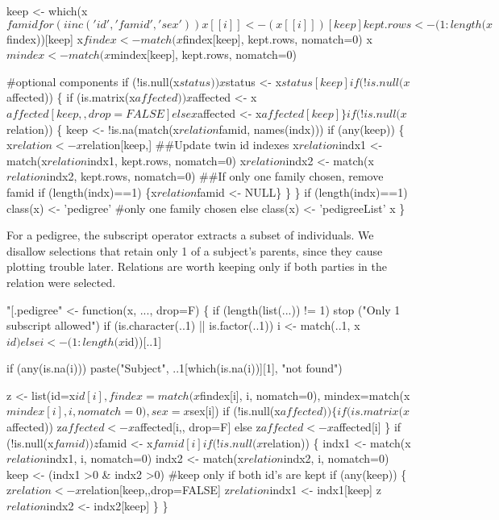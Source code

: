 \documentclass{article}
\begin{document}
    keep <- which(x$famid %
    for (i in c('id', 'famid', 'sex'))
        x[[i]] <- (x[[i]])[keep]
    
    kept.rows <- (1:length(x$findex))[keep]
    x$findex <- match(x$findex[keep], kept.rows, nomatch=0)
    x$mindex <- match(x$mindex[keep], kept.rows, nomatch=0)
    
    #optional components
    if (!is.null(x$status)) x$status <- x$status[keep]
    if (!is.null(x$affected)) \{
        if (is.matrix(x$affected)) x$affected <- x$affected[keep,,drop=FALSE]
        else x$affected <- x$affected[keep]
        \}
    if (!is.null(x$relation)) \{
        keep <- !is.na(match(x$relation$famid, names(indx)))
        if (any(keep)) \{
            x$relation <- x$relation[keep,]
            ##Update twin id indexes
            x$relation$indx1 <- match(x$relation$indx1, kept.rows, nomatch=0)
            x$relation$indx2 <- match(x$relation$indx2, kept.rows, nomatch=0)
            ##If only one family chosen, remove famid
            if (length(indx)==1) \{x$relation$famid <- NULL\}
            \}
        \}
    if (length(indx)==1)  class(x) <- 'pedigree'  #only one family chosen
    else class(x) <- 'pedigreeList'
    x
    \}
\nwendcode{}\nwdocspar

For a pedigree, the subscript operator extracts a subset of individuals.
We disallow selections that retain only 1 of a subject's parents, since    %
they cause plotting trouble later.
Relations are worth keeping only if both parties in the relation were
selected.

\nwenddocs{}\plusendmoddef
"[.pedigree" <- function(x, ..., drop=F) \{
    if (length(list(...)) != 1) stop ("Only 1 subscript allowed")
    if (is.character(..1) || is.factor(..1)) i <- match(..1, x$id)
    else i <- (1:length(x$id))[..1]
    
    if (any(is.na(i))) paste("Subject", ..1[which(is.na(i))][1], "not found")

    z <- list(id=x$id[i],findex=match(x$findex[i], i, nomatch=0),
              mindex=match(x$mindex[i], i, nomatch=0),
             sex=x$sex[i])
    if (!is.null(x$affected)) \{
        if (is.matrix(x$affected)) z$affected <- x$affected[i,, drop=F]
        else z$affected <- x$affected[i]
    \}
    if (!is.null(x$famid)) z$famid <- x$famid[i]

   
    if (!is.null(x$relation)) \{
      indx1 <- match(x$relation$indx1, i, nomatch=0)
      indx2 <- match(x$relation$indx2, i, nomatch=0)
      keep <- (indx1 >0 & indx2 >0)  #keep only if both id's are kept
      if (any(keep)) \{
        z$relation <- x$relation[keep,,drop=FALSE]
        z$relation$indx1 <- indx1[keep]
        z$relation$indx2 <- indx2[keep]
      \}
    \}
    
\end{document}
